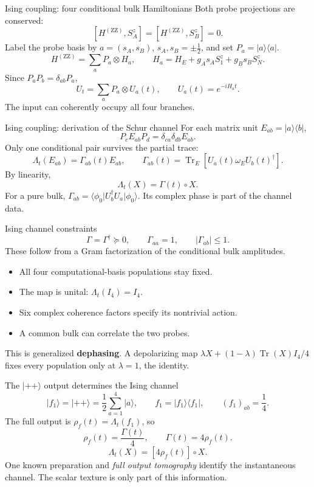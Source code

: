 \documentclass[aspectratio=169,11pt]{beamer}
\newcommand{\ket}[1]{\lvert #1\rangle}
\newcommand{\bra}[1]{\langle #1\rvert}
\newcommand{\Tr}{\operatorname{Tr}}
\newcommand{\ZZ}{\mathrm{ZZ}}
\begin{document}
\begin{frame}{Ising coupling: four conditional bulk Hamiltonians}
Both probe projections are conserved:
\[
[H^{(\ZZ)},S_A^z]=[H^{(\ZZ)},S_B^z]=0.
\]
Label the probe basis by $a=(s_A,s_B)$, $s_A,s_B=\pm\frac12$,
and set $P_a=\ket a\bra a$.
\[
\boxed{H^{(\ZZ)}=\sum_aP_a\otimes H_a,\qquad
H_a=H_E+g_As_AS_1^z+g_Bs_BS_N^z.}
\]
Since $P_aP_b=\delta_{ab}P_a$,
\[
U_t=\sum_aP_a\otimes U_a(t),\qquad U_a(t)=e^{-iH_at}.
\]
The input can coherently occupy all four branches.
\end{frame}

\begin{frame}{Ising coupling: derivation of the Schur channel}
For each matrix unit $E_{ab}=\ket a\bra b$,
\[
P_cE_{ab}P_d=\delta_{ca}\delta_{db}E_{ab}.
\]
Only one conditional pair survives the partial trace:
\[
\Lambda_t(E_{ab})=\Gamma_{ab}(t)E_{ab},\qquad
\Gamma_{ab}(t)=\Tr_E[U_a(t)\omega_EU_b(t)^\dagger].
\]
By linearity,
\[
\boxed{\Lambda_t(X)=\Gamma(t)\circ X.}
\]
For a pure bulk, $\Gamma_{ab}=\bra{\phi_0}U_b^\dagger U_a\ket{\phi_0}$.
Its complex phase is part of the channel data.
\end{frame}

\begin{frame}{Ising channel constraints}
\[
\Gamma=\Gamma^\dagger\succeq0,\qquad
\Gamma_{aa}=1,\qquad |\Gamma_{ab}|\le1.
\]
These follow from a Gram factorization of the conditional bulk amplitudes.
\medskip
\begin{itemize}\setlength\itemsep{8pt}
\item All four computational-basis populations stay fixed.
\item The map is unital: $\Lambda_t(I_4)=I_4$.
\item Six complex coherence factors specify its nontrivial action.
\item A common bulk can correlate the two probes.
\end{itemize}
\medskip
This is generalized \textbf{dephasing}. A depolarizing map
$\lambda X+(1-\lambda)\Tr(X)I_4/4$ fixes every population only at
$\lambda=1$, the identity.
\end{frame}

\begin{frame}{The $\ket{++}$ output determines the Ising channel}
\[
\ket{f_1}=\ket{++}=\frac12\sum_{a=1}^4\ket a,\qquad
f_1=\ket{f_1}\bra{f_1},\qquad (f_1)_{ab}=\frac14.
\]
The full output is $\rho_f(t)=\Lambda_t(f_1)$, so
\[
\boxed{\rho_f(t)=\frac{\Gamma(t)}4,\qquad \Gamma(t)=4\rho_f(t).}
\]
\[
\Lambda_t(X)=[4\rho_f(t)]\circ X.
\]
One known preparation and \emph{full output tomography} identify the
instantaneous channel. The scalar texture is only part of this information.
\end{frame}
\end{document}
